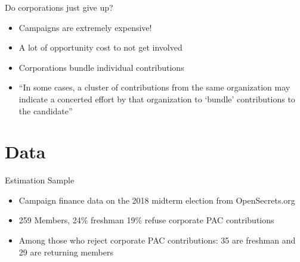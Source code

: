 \documentclass[12pt, aspectratio=169]{beamer}
\begin{document}
\begin{frame}{Do corporations just give up?}
	\begin{itemize}
		\item Campaigns are extremely expensive! \pause
		\item A lot of opportunity cost to not get involved {\tiny \citep{denzau1986, kroszner1998}} \pause
		\item Corporations bundle individual contributions \pause
		\item ``In some cases, a cluster of contributions from the same organization may indicate a concerted effort by that organization to ‘bundle’ contributions to the candidate” {\tiny \citep{opensecrets.org}}
	\end{itemize}
\end{frame}

\section{Data}

\begin{frame}{Estimation Sample}
	\begin{itemize}
		\item Campaign finance data on the 2018 midterm election from OpenSecrets.org \pause
		\item 259 Members, 24\% freshman 19\% refuse corporate PAC contributions \pause
		\item Among those who reject corporate PAC contributions: 35 are freshman and 29 are returning members
	\end{itemize}
\end{frame}
\end{document}
